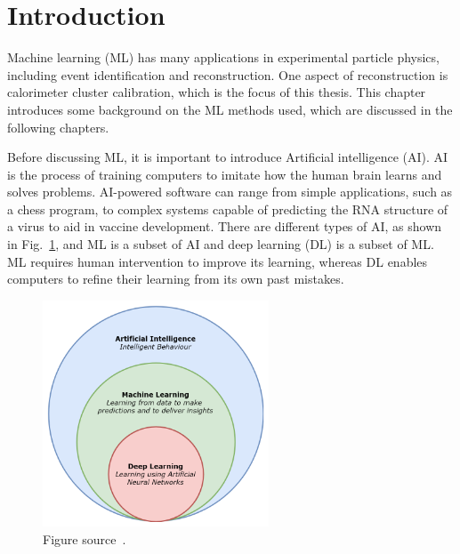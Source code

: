 
\section{Introduction}
Machine learning (ML) has many applications in experimental particle physics, including event identification and reconstruction.
One aspect of reconstruction is calorimeter cluster calibration, which is the focus of this thesis.
This chapter introduces some background on the ML methods used, which are discussed in the following chapters. %

Before discussing ML, it is important to introduce Artificial intelligence (AI).
AI is the process of training computers to imitate how the human brain learns and solves problems.
AI-powered software can range from simple applications, such as a chess program, to complex systems capable of predicting the RNA structure of a virus to aid in vaccine development.
There are different types of AI, as shown in Fig.~\ref{fig:ML_diagram}, and ML is a subset of AI and deep learning (DL) is a subset of ML.
ML requires human intervention to improve its learning, whereas DL enables computers to refine their learning from its own past mistakes.

\begin{figure}[t!]
\centering
\includegraphics[width=0.60\textwidth]{figures/ML_subsections.png}
\caption[Diagram of AI subsections]{Figure source~\cite{SMtable}.}
\label{fig:ML_diagram}
\end{figure}

